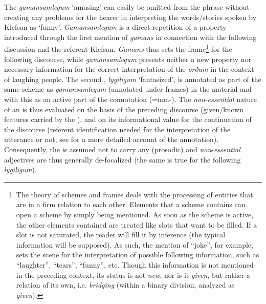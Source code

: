 \documentclass[output=paper,colorlinks,citecolor=brown]{langscibook}
\begin{document}
\begin{sloppypar}
The  \emph{gamansamlegum} `amusing' can easily be omitted from the phrase
without creating any problems for the hearer in interpreting the
words/stories spoken by Klefsan as `funny'.
\emph{Gamansamlegum} is a direct repetition of a property introduced
through the first mention of \emph{gamans} in connection with the following
discussion and the referent Klefsan. \emph{Gamans} thus sets the
frame\footnote{The theory of schemes and frames deals with the
  processing of entities that are in a firm relation to each other.
  Elements that a scheme contains can open a scheme by simply being
  mentioned. As soon as the scheme is active, the other elements
  contained are treated like slots that want to be filled. If a slot is
  not saturated, the reader will fill it by inference (the typical
  information will be supposed). As such, the mention of “joke”, for example, sets the scene for the interpretation of possible following information, such as “laughter”, “tears”, “funny”, etc. Though this information is not mentioned in the preceding
context, its status is not \textit{new}, nor is it \textit{given}, but rather a relation of its own, i.e. \textit{bridging} (within a binary division, analyzed as \textit{given}).} for the following
discourse, while \emph{gamansamlegum}
presents neither a new property nor necessary information for the
correct interpretation of the  \emph{orðum} in the context of
laughing people\emph{.} The second , \emph{lygiligum} `fantasized', is
annotated as part of the same scheme as \emph{gamansamlegum} (annotated
under frames) in the  material and with this as an active part of
the connotation (=non-). The \emph{non}-\emph{essential}
nature of an  is thus evaluated on the basis of the preceding
discourse (given/known features carried by the ), and on its
informational value for the continuation of the discourse (referent
identification needed for the interpretation of the utterance or not;
see \cite[94ff]{Tiemann2023} for a more detailed account of the  annotation).
Consequently, the  is assumed not to carry any (prosodic)
 and \emph{non}-\emph{essential} adjectives are thus generally
de-focalized (the same is true for the following 
\emph{lygiligum}).
\end{sloppypar}
\end{document}
